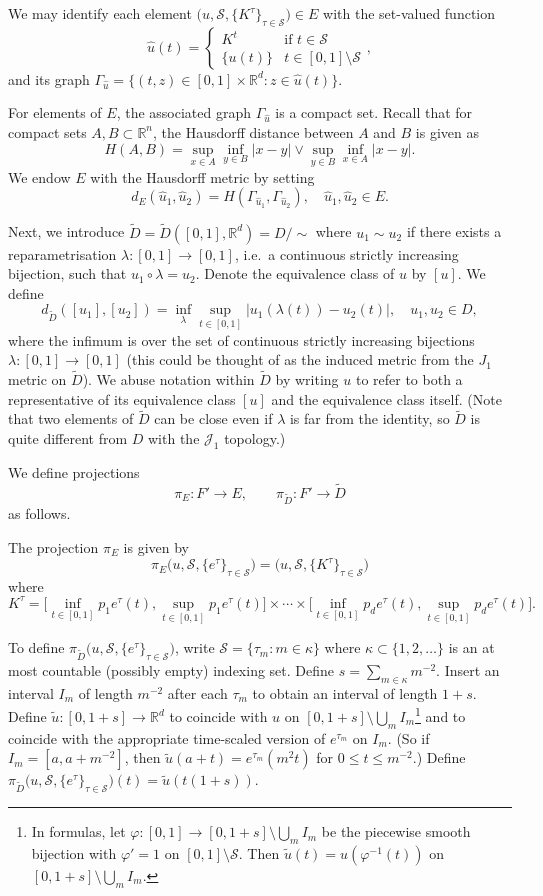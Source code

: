 \documentclass[12pt]{article}
\numberwithin{equation}{section}
\newcommand{\R}{{\mathbb R}}
\newcommand{\cJ}{{\mathcal J}}
\newcommand{\cS}{{\mathcal S}}
\newcommand{\tD}{{\widetilde D}}
\begin{document}
We may identify each element $\big(u,\cS,\{K^\tau\}_{\tau\in\cS}\big)\in E$ with the set-valued function
\[
\hat u(t)=\begin{cases}
    K^t& \text{if } t\in \cS\\
    \{u(t)\}              & t\in[0,1]\setminus\cS
\end{cases}, 
\]
and its graph $\Gamma_{\hat u}=\{(t,z)\in [0,1]\times\R^d : z\in \hat u(t)\}$.  

For elements of $E$, the associated graph $\Gamma_{\hat u}$ is a compact set. 
Recall that for compact sets $A,B\subset \R^n$, the Hausdorff distance between $A$ and $B$ is given as
$$
H(A,B)=
\sup_{x\in A}\inf_{y\in B}|x-y| \vee \sup_{y\in B}\inf_{x\in A}|x-y|.
$$
We endow $E$ with the Hausdorff metric by setting
\[
d_E(\hat u_1, \hat u_2)=H(\Gamma_{\hat u_1},\Gamma_{\hat u_2}),
\quad \hat u_1,\hat u_2 \in E.
\]

Next, we introduce $\tD= \tD([0, 1], \R^d)= D/{\sim}$ where $u_1\sim u_2$ if there exists a reparametrisation $\lambda:[0, 1]\to [0, 1]$, i.e.\ a continuous strictly increasing bijection, such that $u_1\circ \lambda=u_2$.  Denote the equivalence class of $u$ by $[u]$.  We define
\[
d_{\tD}([u_1], [u_2]) = \inf_{\lambda}\sup_{t\in[0,1]}|u_1(\lambda(t))- u_2(t)|,
 \quad u_1,u_2 \in D,
\]
where the infimum is over the set of continuous strictly increasing bijections $\lambda:[0,1]\to [0,1]$ (this could be thought of as the induced metric from the $J_1$ metric on $\tD$).
We abuse notation within $\tD$ by writing $u$ to refer to both a representative of its equivalence class $[u]$ and the equivalence class itself. 
(Note that two elements of $\tD$ can be close even if $\lambda$ is far from the identity, so $\tD$ is quite different from $D$ with the $\cJ_1$ topology.)


We define projections 
\[
\pi_E:F'\to E, \qquad \pi_\tD:F'\to \tD
\]
as follows.

The projection $\pi_E$ is given by
\[
\pi_E\big(u, \cS, \{e^\tau\}_{\tau\in \cS})=\big(u, \cS, \{K^\tau\}_{\tau\in \cS}\big)
\]
 where
$$
K^\tau=\Big[\inf_{t\in [0,1]} p_1 e^{\tau}(t), \sup_{t\in [0,1]} p_1e^{\tau}(t)\Big]\times\cdots\times \Big[\inf_{t\in [0,1]} p_de^{\tau}(t), \sup_{t\in [0,1]} p_de^{\tau}(t)\Big].
$$

To define $\pi_\tD\big(u, \cS, \{e^\tau\}_{\tau\in \cS}\big)$, 
write $\cS=\{\tau_m:m\in\kappa\}$ where $\kappa\subset\{1,2,\dots\}$ is an at most countable (possibly empty) indexing set.
Define $s=\sum_{m\in\kappa}m^{-2}$.
Insert an interval $I_m$ of length $m^{-2}$ after each $\tau_m$ to obtain an interval of length $1+s$. Define 
$\tilde u:[0,1+s]\to\R^d$ to coincide with $u$ on $[0,1+s]\setminus\bigcup_m I_m$\footnote{In formulas, let $\varphi:[0,1]\to [0,1+s]\setminus\bigcup_m I_m$ be the piecewise smooth bijection with $\varphi'=1$ on $[0,1]\setminus\cS$.
Then $\tilde u(t)=u(\varphi^{-1}(t))$ on $[0,1+s]\setminus\bigcup_m I_m$.}  and 
to coincide with the appropriate time-scaled version of $e^{\tau_m}$ on 
$I_m$. (So if $I_m=[a,a+m^{-2}]$, then $\tilde u(a+t)=e^{\tau_m}(m^2t)$ for $0\le t\le m^{-2}$.)
Define $\pi_\tD\big(u, \cS, \{e^\tau\}_{\tau\in \cS}\big)(t) = \tilde u(t(1+s))$.
\end{document}
